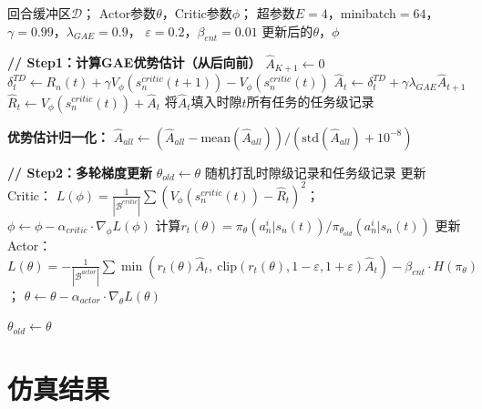 \documentclass[a4paper,11pt]{article}
\begin{document}
\begin{algorithm}[t]
\caption{MAPPO网络参数更新（训练层）}
\label{alg:training}
\begin{algorithmic}[1]
\REQUIRE 回合缓冲区$\mathcal{D}$；
         Actor参数$\theta$，Critic参数$\phi$；
         超参数$E=4$，minibatch$=64$，
         $\gamma=0.99$，$\lambda_{GAE}=0.9$，
         $\varepsilon=0.2$，$\beta_{ent}=0.01$
\ENSURE 更新后的$\theta$，$\phi$

\STATE \textbf{// Step1：计算GAE优势估计（从后向前）}
    \STATE $\hat{A}_{K+1} \leftarrow 0$
        \STATE $\delta^{TD}_t \leftarrow R_n(t)
               + \gamma V_\phi(s^{critic}_n(t+1))
               - V_\phi(s^{critic}_n(t))$
        \STATE $\hat{A}_t \leftarrow \delta^{TD}_t
               + \gamma\lambda_{GAE}\hat{A}_{t+1}$
        \STATE $\hat{R}_t \leftarrow V_\phi(s^{critic}_n(t))
               + \hat{A}_t$
        \STATE 将$\hat{A}_t$填入时隙$t$所有任务的任务级记录
    \ENDFOR
\ENDFOR

\STATE \textbf{优势估计归一化：}
\STATE $\hat{A}_{all} \leftarrow
       (\hat{A}_{all} - \text{mean}(\hat{A}_{all}))
       / (\text{std}(\hat{A}_{all}) + 10^{-8})$

\STATE \textbf{// Step2：多轮梯度更新}
\STATE $\theta_{old} \leftarrow \theta$
    \STATE 随机打乱时隙级记录和任务级记录
        \STATE 更新Critic：
               $L(\phi) = \frac{1}{|\mathcal{B}^{critic}|}
               \sum(V_\phi(s^{critic}_n(t)) - \hat{R}_t)^2$；
               $\phi \leftarrow \phi - \alpha_{critic}\cdot\nabla_\phi L(\phi)$
        \STATE 计算$r_t(\theta) =
               \pi_\theta(a^i_n|s_n(t))
               / \pi_{\theta_{old}}(a^i_n|s_n(t))$
        \STATE 更新Actor：
               $L(\theta) = -\frac{1}{|\mathcal{B}^{actor}|}
               \sum\min(r_t(\theta)\hat{A}_t,\
               \text{clip}(r_t(\theta),
               1-\varepsilon, 1+\varepsilon)\hat{A}_t)
               - \beta_{ent}\cdot H(\pi_\theta)$；
               $\theta \leftarrow \theta - \alpha_{actor}\cdot\nabla_\theta L(\theta)$
    \ENDFOR
\ENDFOR

\STATE $\theta_{old} \leftarrow \theta$
\end{algorithmic}
\end{algorithm}

\section{仿真结果}
\label{sec:simulation}
\end{document}
